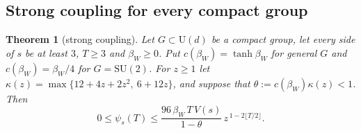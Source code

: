 \documentclass[11pt,a4paper]{amsart}
\newtheorem{theorem}{Theorem}[section]
\theoremstyle{definition}
\theoremstyle{remark}
\numberwithin{equation}{section}
\newcommand{\SU}{\mathrm{SU}}              %
\newcommand{\U}{\mathrm{U}}                %
\newcommand{\psiT}[2]{\psi_{#1}(#2)}       %
\newcommand{\Vol}[1]{V(#1)}                %
\newcommand{\betaW}{\beta_{W}}             %
\begin{document}
\subsection{Strong coupling for every compact group}

\begin{theorem}[strong coupling]\label{thm:strong-coupling}
Let $G\subset\U(d)$ be a compact group, let every side of $s$ be at least $3$, $T\ge3$ and $\betaW\ge0$. Put $c(\betaW)=\tanh\betaW$ for general $G$ and $c(\betaW)=\betaW/4$ for $G=\SU(2)$. For $z\ge1$ let $\kappa(z)=\max\{12+4z+2z^2,\ 6+12z\}$, and suppose that $\theta:=c(\betaW)\kappa(z)<1$. Then
\begin{equation}\label{eq:sc-bound}
0\le\psiT{s}{T}\le\frac{96\,\betaW\,T\,\Vol{s}}{1-\theta}\,z^{\,1-2\lfloor T/2\rfloor}.
\end{equation}
\end{theorem}
\end{document}
